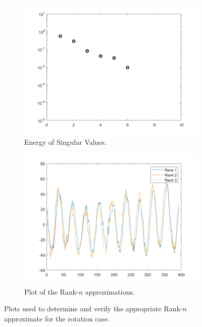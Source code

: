 \documentclass[12pt]{article}%
\begin{document}
\begin{figure}
    \begin{subfigure}[b]{0.5\linewidth}
      \centering
      \includegraphics[width=\linewidth]{4-energy.png}
      \caption{Energy of Singular Values.}
      \label{fig4:a}
      \vspace{4ex}
    \end{subfigure}%
    \begin{subfigure}[b]{0.5\linewidth}
      \centering
      \includegraphics[width=\linewidth]{4-aprox.png}
      \caption{Plot of the Rank-$n$ approximations.}
      \label{fig4:b}
      \vspace{4ex}
    \end{subfigure}
    \caption{Plots used to determine and verify the appropriate Rank-$n$ approximate for the rotation case.}
    \label{fig4}
\end{figure}
\end{document}
